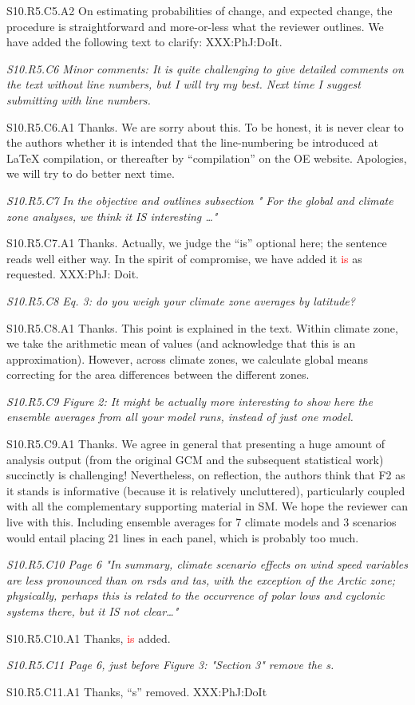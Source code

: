 \documentclass[a4paper,10pt]{article}
\newcommand{\ed}[1]{\textcolor{red}{#1}}
\begin{document}
	S10.R5.C5.A2 On estimating probabilities of change, and expected change, the procedure is straightforward and more-or-less what the reviewer outlines. We have added the following text to clarify: XXX:PhJ:DoIt.
	
	\emph{S10.R5.C6 Minor comments: It is quite challenging to give detailed comments on the text without line numbers, but I will try my best. Next time I suggest submitting with line numbers.}
	
	S10.R5.C6.A1 Thanks. We are sorry about this. To be honest, it is never clear to the authors whether it is intended that the line-numbering be introduced at LaTeX compilation, or thereafter by ``compilation'' on the OE website. Apologies, we will try to do better next time.

	\emph{S10.R5.C7 In the objective and outlines subsection " For the global and climate zone analyses, we think it IS interesting …"}
		
	S10.R5.C7.A1 Thanks. Actually, we judge the ``is'' optional here; the sentence reads well either way. In the spirit of compromise, we have added it \ed{is} as requested. XXX:PhJ: Doit.
	
	\emph{S10.R5.C8 Eq. 3: do you weigh your climate zone averages by latitude?}

	S10.R5.C8.A1 Thanks. This point is explained in the text. Within climate zone, we take the arithmetic mean of values (and acknowledge that this is an approximation). However, across climate zones, we calculate global means correcting for the area differences between the different zones.

	\emph{S10.R5.C9 Figure 2: It might be actually more interesting to show here the ensemble averages from all your model runs, instead of just one model.}

	S10.R5.C9.A1 Thanks. We agree in general that presenting a huge amount of analysis output (from the original GCM and the subsequent statistical work) succinctly is challenging! Nevertheless, on reflection, the authors think that F2 as it stands is informative (because it is relatively uncluttered), particularly coupled with all the complementary supporting material in SM. We hope the reviewer can live with this. Including ensemble averages for 7 climate models and 3 scenarios would entail placing 21 lines in each panel, which is probably too much.

	\emph{S10.R5.C10 Page 6 "In summary, climate scenario effects on wind speed variables are less pronounced than on rsds and tas, with the exception of the Arctic zone; physically, perhaps this is related to the occurrence of polar lows and cyclonic systems there, but it IS not clear…"}

	S10.R5.C10.A1 Thanks, \ed{is} added.

	\emph{S10.R5.C11 Page 6, just before Figure 3: "Section 3" remove the s.}

	S10.R5.C11.A1 Thanks, ``s'' removed. XXX:PhJ:DoIt

	
	
	
\end{document}
